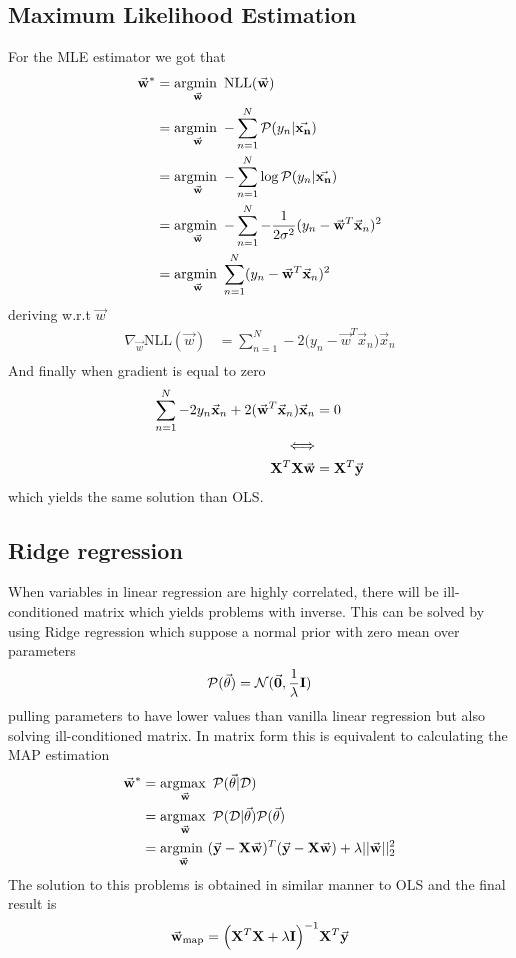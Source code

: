 \documentclass[../main.tex]{subfiles}
\begin{document}
\subsection{Maximum Likelihood Estimation}
For the MLE estimator we got that
\begin{align*}
    \vec{w}^* &=
    \argmin_{\vec{w}} \text{NLL}(\vec{w})\\
    &= \argmin_{\vec{w}} -\sum_{n=1}^N \p(y_n|\vec{x_n})\\
    &= \argmin_{\vec{w}} -\sum_{n=1}^N \log\p(y_n|\vec{x_n})\\
    &= \argmin_{\vec{w}} -\sum_{n=1}^N -\frac{1}{2\sigma^2}(y_n-\vec{w}^T\vec{x}_n)^2\\
    &= \argmin_{\vec{w}} \sum_{n=1}^N (y_n-\vec{w}^T\vec{x}_n)^2\\
\end{align*}
deriving w.r.t $\vec{w}$
\begin{align*}
    \nabla_{\vec{w}}\text{NLL}(\vec{w})
    &=\sum_{n=1}^N -2\big(y_n-\vec{w}^T\vec{x}_n\big)\vec{x}_n\\
\end{align*}
And finally when gradient is equal to zero
\begin{align*}
    \sum_{n=1}^N -2y_n\vec{x}_n + 2(\vec{w}^T\vec{x}_n)\vec{x}_n &= 0\\
    \Longleftrightarrow & \\
    \mat{X}^T\mat{X}\vec{w} &= \mat{X}^T\vec{y}\\
\end{align*}
which yields the same solution than OLS.

\subsection{Ridge regression}
When variables in linear regression are highly correlated, there will be ill-conditioned matrix which yields problems with inverse. This can be solved by using Ridge regression which suppose a normal prior with zero mean over parameters
\begin{equation*}
    \p(\vec{\theta}) = \normal(\vec{0},\frac{1}{\lambda}\mat{I})
\end{equation*}
pulling parameters to have lower values than vanilla linear regression but also solving ill-conditioned matrix. In matrix form this is equivalent to calculating the MAP estimation
\begin{align*}
    \vec{w}^*
    &= \argmax_{\vec{w}} \p(\vec{\theta}|\D)\\
    &= \argmax_{\vec{w}} \p(\D|\vec{\theta}) \p(\vec{\theta})\\
    &= \argmin_{\vec{w}} (\vec{y}-\mat{X}\vec{w})^T(\vec{y}-\mat{X}\vec{w}) + \lambda||\vec{w}||_2^2
\end{align*}
The solution to this problems is obtained in similar manner to OLS and the final result is
\begin{equation*}
    \vec{w}_{\text{map}} = \Big(\mat{X}^T\mat{X} + \lambda\mat{I}\Big)^{-1}\mat{X}^T\vec{y}
\end{equation*}
\end{document}
